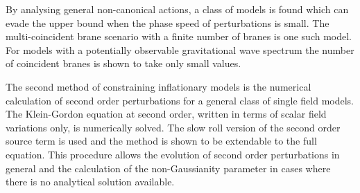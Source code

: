 % 
By analysing general non-canonical actions, a class of models is found which can
evade the upper bound when the phase speed of perturbations is small. The multi-coincident brane
scenario with a finite number of branes is one such model. 
For models with a potentially observable gravitational wave spectrum the number of coincident branes
is shown to take only small values. 

The second method of constraining inflationary models is the numerical calculation
of second order perturbations for a general class of single field models.
The Klein-Gordon equation at second order, written in terms
of scalar field variations only, is numerically solved. 
The slow roll version of the second order source term is used and the method is
shown to be extendable to the full equation.
This procedure allows the evolution of second order
perturbations in general and the calculation of the non-Gaussianity parameter in
cases
where there is no analytical solution available.  


